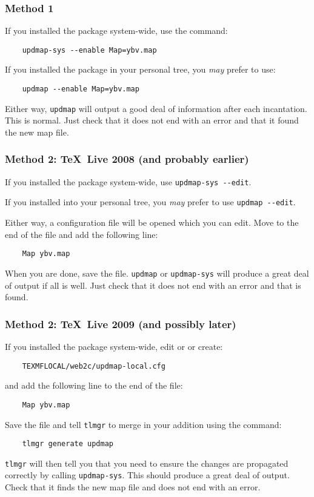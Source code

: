 \documentclass[11pt,british]{article}
\begin{document}
\subsubsection{Method 1}

If you installed the package system-wide, use the command:
\begin{verbatim}
	updmap-sys --enable Map=ybv.map
\end{verbatim}
If you installed the package in your personal tree, you \emph{may} prefer to use:
\begin{verbatim}
	updmap --enable Map=ybv.map
\end{verbatim}

Either way, \verb|updmap| will output a good deal of information after each incantation. This is normal. Just check that it does not end with an error and that it found the new map file.

\subsubsection{Method 2: \TeX~Live 2008 (and probably earlier)}

If you installed the package system-wide, use \verb|updmap-sys --edit|.

If you installed into your personal tree, you \emph{may} prefer to use	\verb|updmap --edit|.

Either way, a configuration file will be opened which you can edit. Move to the end of the file and add the following line:
\begin{verbatim}
	Map ybv.map
\end{verbatim}
When you are done, save the file. \verb|updmap| or \verb|updmap-sys| will produce a great deal of output if all is well. Just check that it does not end with an error and that  is found.

\subsubsection{Method 2: \TeX~Live 2009 (and possibly later)}

If you installed the package system-wide, edit or or create:
\begin{verbatim}
	TEXMFLOCAL/web2c/updmap-local.cfg
\end{verbatim}
and add the following line to the end of the file:
\begin{verbatim}
	Map ybv.map
\end{verbatim}
Save the file and tell \verb|tlmgr| to merge in your addition using the command:
\begin{verbatim}
	tlmgr generate updmap
\end{verbatim}
\verb|tlmgr| will then tell you that you need to ensure the changes are propagated correctly by calling \verb|updmap-sys|. This should produce a great deal of output. Check that it finds the new map file and does not end with an error.
\end{document}
